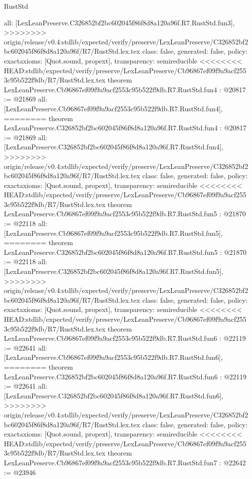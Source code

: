 \begin{lexlean}{RustStd}
\begin{coremodule}
{\begin{coremodule}
{{{{{{{  all: [LexLeanPreserve.C326852bf2bc602045f86f8d8a120a96f.R7.RustStd.fun3],
>>>>>>>> origin/release/v0.4:stdlib/expected/verify/preserve/LexLeanPreserve/C326852bf2bc602045f86f8d8a120a96f/R7/RustStd.lex.tex
  class: false,
  generated: false,
  policy: exact{axioms: [Quot.sound, propext]},
  transparency: semireducible
}
<<<<<<<< HEAD:stdlib/expected/verify/preserve/LexLeanPreserve/Cb96867ef09f9a9acf2553c95b522f9db/R7/RustStd.lex.tex
theorem LexLeanPreserve.Cb96867ef09f9a9acf2553c95b522f9db.R7.RustStd.fun4 : @20817 := @21869 {
  all: [LexLeanPreserve.Cb96867ef09f9a9acf2553c95b522f9db.R7.RustStd.fun4],
========
theorem LexLeanPreserve.C326852bf2bc602045f86f8d8a120a96f.R7.RustStd.fun4 : @20817 := @21869 {
  all: [LexLeanPreserve.C326852bf2bc602045f86f8d8a120a96f.R7.RustStd.fun4],
>>>>>>>> origin/release/v0.4:stdlib/expected/verify/preserve/LexLeanPreserve/C326852bf2bc602045f86f8d8a120a96f/R7/RustStd.lex.tex
  class: false,
  generated: false,
  policy: exact{axioms: [Quot.sound, propext]},
  transparency: semireducible
}
<<<<<<<< HEAD:stdlib/expected/verify/preserve/LexLeanPreserve/Cb96867ef09f9a9acf2553c95b522f9db/R7/RustStd.lex.tex
theorem LexLeanPreserve.Cb96867ef09f9a9acf2553c95b522f9db.R7.RustStd.fun5 : @21870 := @22118 {
  all: [LexLeanPreserve.Cb96867ef09f9a9acf2553c95b522f9db.R7.RustStd.fun5],
========
theorem LexLeanPreserve.C326852bf2bc602045f86f8d8a120a96f.R7.RustStd.fun5 : @21870 := @22118 {
  all: [LexLeanPreserve.C326852bf2bc602045f86f8d8a120a96f.R7.RustStd.fun5],
>>>>>>>> origin/release/v0.4:stdlib/expected/verify/preserve/LexLeanPreserve/C326852bf2bc602045f86f8d8a120a96f/R7/RustStd.lex.tex
  class: false,
  generated: false,
  policy: exact{axioms: [Quot.sound, propext]},
  transparency: semireducible
}
<<<<<<<< HEAD:stdlib/expected/verify/preserve/LexLeanPreserve/Cb96867ef09f9a9acf2553c95b522f9db/R7/RustStd.lex.tex
theorem LexLeanPreserve.Cb96867ef09f9a9acf2553c95b522f9db.R7.RustStd.fun6 : @22119 := @22641 {
  all: [LexLeanPreserve.Cb96867ef09f9a9acf2553c95b522f9db.R7.RustStd.fun6],
========
theorem LexLeanPreserve.C326852bf2bc602045f86f8d8a120a96f.R7.RustStd.fun6 : @22119 := @22641 {
  all: [LexLeanPreserve.C326852bf2bc602045f86f8d8a120a96f.R7.RustStd.fun6],
>>>>>>>> origin/release/v0.4:stdlib/expected/verify/preserve/LexLeanPreserve/C326852bf2bc602045f86f8d8a120a96f/R7/RustStd.lex.tex
  class: false,
  generated: false,
  policy: exact{axioms: [Quot.sound, propext]},
  transparency: semireducible
}
<<<<<<<< HEAD:stdlib/expected/verify/preserve/LexLeanPreserve/Cb96867ef09f9a9acf2553c95b522f9db/R7/RustStd.lex.tex
theorem LexLeanPreserve.Cb96867ef09f9a9acf2553c95b522f9db.R7.RustStd.fun7 : @22642 := @23946 {
}}}}}}}}}}
\end{coremodule}}
\end{coremodule}
\end{lexlean}
